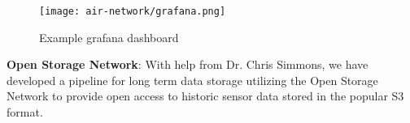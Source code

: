 \begin{figure}[!h]
  \centering
  \texttt{[image: air-network/grafana.png]}
  \caption{Example grafana dashboard}
  \label{fig:grafana}
\end{figure}





\textbf{Open Storage Network}: With help from Dr. Chris Simmons, we have
  developed a pipeline for long term data storage utilizing the Open Storage
  Network to provide open access to historic sensor data stored in the popular
  S3 format.
 


